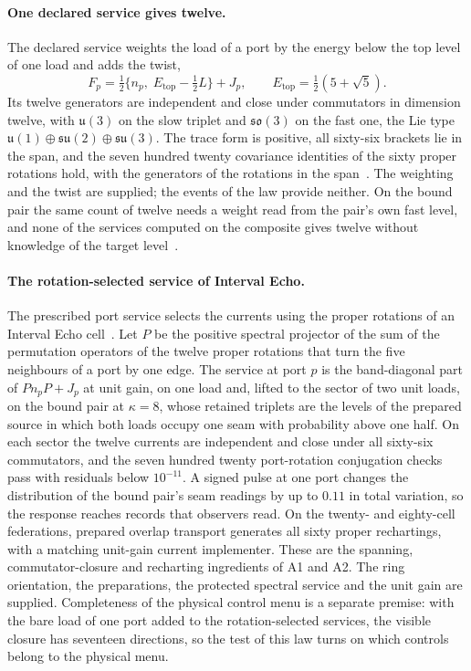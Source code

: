 \documentclass[11pt]{article}
\begin{document}
\paragraph{One declared service gives twelve.}
The declared service weights the load of a port by the energy below the top
level of one load and adds the twist,
\[
 F_p=\tfrac12\bigl\{n_p,\;E_{\mathrm{top}}-\tfrac12L\bigr\}+J_p,\qquad
 E_{\mathrm{top}}=\tfrac12(5+\sqrt5).
\]
Its twelve generators are independent and close under commutators in
dimension twelve, with \(\mathfrak u(3)\) on the slow triplet and
\(\mathfrak{so}(3)\) on the fast one, the Lie type
\(\mathfrak u(1)\oplus\mathfrak{su}(2)\oplus\mathfrak{su}(3)\). The trace form
is positive, all sixty-six brackets lie in the span, and the seven hundred
twenty covariance identities of the sixty proper rotations hold, with the
generators of the rotations in the span~\cite{ophmodel}. The weighting and
the twist are supplied; the events of the law provide neither. On the bound
pair the same count of twelve needs a weight read from the pair's own fast
level, and none of the services computed on the composite gives twelve
without knowledge of the target level~\cite{ophmodel}.

\paragraph{The rotation-selected service of Interval Echo.}
The prescribed port service selects the currents using the proper rotations
of an Interval Echo cell~\cite{ophmodel}. Let \(P\) be the positive spectral projector of
the sum of the permutation operators of the twelve proper rotations that turn
the five neighbours of a port by one edge. The service at port \(p\) is the
band-diagonal part of \(Pn_pP+J_p\) at unit gain, on one load and, lifted to
the sector of two unit loads, on the bound pair at \(\kappa=8\), whose
retained triplets are the levels of the prepared source in which both loads
occupy one seam with probability above one half. On each sector the twelve
currents are independent and close under all sixty-six commutators, and the
seven hundred twenty port-rotation conjugation checks pass with residuals
below \(10^{-11}\). A signed pulse at one port changes the distribution of
the bound pair's seam readings by up to \(0.11\) in total variation, so the
response reaches records that observers read. On the twenty- and eighty-cell
federations, prepared overlap transport generates all sixty proper
rechartings, with a matching unit-gain current implementer. These are the
spanning, commutator-closure and recharting ingredients of A1 and A2. The
ring orientation, the preparations, the protected spectral service and the
unit gain are supplied. Completeness of the physical control menu is a
separate premise: with the bare load of one port added to the
rotation-selected services, the visible closure has seventeen directions, so
the test of this law turns on which controls belong to the physical menu.
\end{document}
